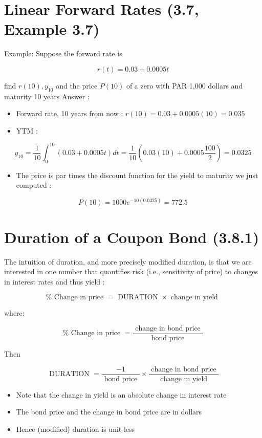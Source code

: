\documentclass[letterpaper]{article}
\begin{document}
\section*{Linear Forward Rates (3.7, Example 3.7)}
Example: Suppose the forward rate is

$$
r(t)=0.03+0.0005 t
$$

find $r(10), y_{10}$ and the price $P(10)$ of a zero with PAR 1,000 dollars and maturity 10 years Answer :

\begin{itemize}
  \item Forward rate, 10 years from now : $r(10)=0.03+0.0005(10)=0.035$
  \item YTM :
\end{itemize}

$$
y_{10}=\frac{1}{10} \int_{0}^{10}(0.03+0.0005 t) d t=\frac{1}{10}\left(0.03(10)+0.0005 \frac{100}{2}\right)=0.0325
$$

\begin{itemize}
  \item The price is par times the discount function for the yield to maturity we just computed :
\end{itemize}

$$
P(10)=1000 e^{-10(0.0325)}=772.5
$$

\section*{Duration of a Coupon Bond (3.8.1)}
The intuition of duration, and more precisely modified duration, is that we are interested in one number that quantifies risk (i.e., sensitivity of price) to changes in interest rates and thus yield :

$$
\% \text { Change in price }=\text { DURATION } \times \text { change in yield }
$$

where:

$$
\% \text { Change in price }=\frac{\text { change in bond price }}{\text { bond price }}
$$

Then

$$
\text { DURATION }=\frac{-1}{\text { bond price }} \times \frac{\text { change in bond price }}{\text { change in yield }}
$$

\begin{itemize}
  \item Note that the change in yield is an absolute change in interest rate
  \item The bond price and the change in bond price are in dollars
  \item Hence (modified) duration is unit-less
\end{itemize}
\end{document}
